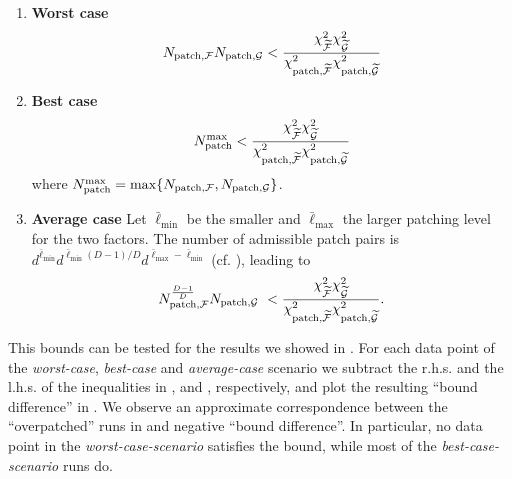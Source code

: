 \begingroup
\renewcommand{\labelenumi}{(\alph{enumi})}
    \begin{enumerate}
        \item \textbf{Worst case}
        \begin{equation}
          N_{\text{patch},\mathcal{F}}N_{\text{patch},\mathcal{G}}
    <\frac{\chi^2_{\widetilde{\mathcal{F}}}\chi^2_{\widetilde{\mathcal{G}}}}{\chi^2_{\text{patch},\widetilde{\mathcal{F}}}\chi^2_{\text{patch},\widetilde{\mathcal{G}}}}
            \label{eq:newworstBoundApp}
        \end{equation}
      \item \textbf{Best case}
        \begin{equation}
          N_{\text{patch}}^{\text{max}}
    <\frac{\chi^2_{\widetilde{\mathcal{F}}}\chi^2_{\widetilde{\mathcal{G}}}}{\chi^2_{\text{patch},\widetilde{\mathcal{F}}}\chi^2_{\text{patch},\widetilde{\mathcal{G}}}} 
            \label{eq:newbestBoundApp}
        \end{equation}
      where $N_{\text{patch}}^{\text{max}} = \max \{N_{\text{patch},\mathcal{F}},N_{\text{patch},\mathcal{G}}\}$.

     \item \textbf{Average case} Let \(\bar\ell_{\min}\) be the smaller and \(\bar\ell_{\max}\) the larger patching level for the two factors.  The number of admissible patch pairs is \(d^{\bar\ell_{\min}}d^{\bar\ell_{\min}(D-1)/D}d^{\bar\ell_{\max}-\bar\ell_{\min}}\) (cf. ), leading to
        \begin{equation}
          N^{\frac{D-1}{D}}_{\text{patch},\mathcal{F}}N_{\text{patch},\mathcal{G}}\
    <\frac{\chi^2_{\widetilde{\mathcal{F}}}\chi^2_{\widetilde{\mathcal{G}}}}{\chi^2_{\text{patch},\widetilde{\mathcal{F}}}\chi^2_{\text{patch},\widetilde{\mathcal{G}}}}.
            \label{eq:newaverageBoundApp}
        \end{equation}
    \end{enumerate}
\endgroup
This bounds can be tested for the results we showed in . For each data point of the \textit{worst-case}, \textit{best-case} and \textit{average-case} scenario we subtract the r.h.s. and the l.h.s. of the inequalities in ,  and , respectively, and plot the resulting ``bound difference'' in . We observe an approximate correspondence between the ``overpatched'' runs in  and negative ``bound difference''. In particular, no data point in the \textit{worst-case-scenario} satisfies the bound, while most of the \textit{best-case-scenario} runs do.

